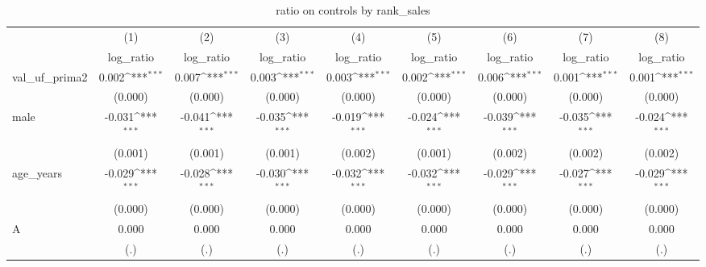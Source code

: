 \begin{table}[htbp]\centering
\def\sym#1{\ifmmode^{#1}\else\(^{#1}\)\fi}
\caption{ratio on controls by rank\_sales}
\begin{tabular}{l*{8}{c}}
\hline\hline
                    &\multicolumn{1}{c}{(1)}&\multicolumn{1}{c}{(2)}&\multicolumn{1}{c}{(3)}&\multicolumn{1}{c}{(4)}&\multicolumn{1}{c}{(5)}&\multicolumn{1}{c}{(6)}&\multicolumn{1}{c}{(7)}&\multicolumn{1}{c}{(8)}\\
                    &\multicolumn{1}{c}{log\_ratio}&\multicolumn{1}{c}{log\_ratio}&\multicolumn{1}{c}{log\_ratio}&\multicolumn{1}{c}{log\_ratio}&\multicolumn{1}{c}{log\_ratio}&\multicolumn{1}{c}{log\_ratio}&\multicolumn{1}{c}{log\_ratio}&\multicolumn{1}{c}{log\_ratio}\\
\hline
val\_uf\_prima2       &       0.002\sym{***}&       0.007\sym{***}&       0.003\sym{***}&       0.003\sym{***}&       0.002\sym{***}&       0.006\sym{***}&       0.001\sym{***}&       0.001\sym{***}\\
                    &     (0.000)         &     (0.000)         &     (0.000)         &     (0.000)         &     (0.000)         &     (0.000)         &     (0.000)         &     (0.000)         \\
[1em]
male                &      -0.031\sym{***}&      -0.041\sym{***}&      -0.035\sym{***}&      -0.019\sym{***}&      -0.024\sym{***}&      -0.039\sym{***}&      -0.035\sym{***}&      -0.024\sym{***}\\
                    &     (0.001)         &     (0.001)         &     (0.001)         &     (0.002)         &     (0.001)         &     (0.002)         &     (0.002)         &     (0.002)         \\
[1em]
age\_years           &      -0.029\sym{***}&      -0.028\sym{***}&      -0.030\sym{***}&      -0.032\sym{***}&      -0.032\sym{***}&      -0.029\sym{***}&      -0.027\sym{***}&      -0.029\sym{***}\\
                    &     (0.000)         &     (0.000)         &     (0.000)         &     (0.000)         &     (0.000)         &     (0.000)         &     (0.000)         &     (0.000)         \\
[1em]
A                   &       0.000         &       0.000         &       0.000         &       0.000         &       0.000         &       0.000         &       0.000         &       0.000         \\
                    &         (.)         &         (.)         &         (.)         &         (.)         &         (.)         &         (.)         &         (.)         &         (.)         \\

\end{tabular}
\end{table}
